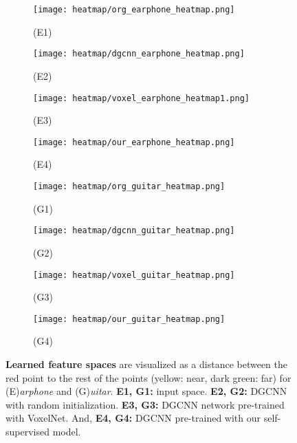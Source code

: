 \documentclass{article}
\begin{document}
\begin{figure}[h]
	\centering    
    	\begin{subfigure}{.45\textwidth}
		\centering
		\texttt{[image: heatmap/org\_earphone\_heatmap.png]}
		\caption*{(E1)}
		\label{fig:heat9}
	\end{subfigure}\begin{subfigure}{.45\textwidth}
		\centering
		\texttt{[image: heatmap/dgcnn\_earphone\_heatmap.png]}
		\caption*{(E2)}
		\label{fig:heat10}
    \end{subfigure}
    \begin{subfigure}{.45\textwidth}
		\centering
		\texttt{[image: heatmap/voxel\_earphone\_heatmap1.png]}
		\caption*{(E3)}
		\label{fig:heat11}
	\end{subfigure}\begin{subfigure}{.45\textwidth}
		\centering
		\texttt{[image: heatmap/our\_earphone\_heatmap.png]}
		\caption*{(E4)}
		\label{fig:heat12}
	\end{subfigure}
	\begin{subfigure}{.45\textwidth}
		\centering
		\texttt{[image: heatmap/org\_guitar\_heatmap.png]}
		\caption*{(G1)}
		\label{fig:heat13}
    \end{subfigure}\begin{subfigure}{.45\textwidth}
		\centering
		\texttt{[image: heatmap/dgcnn\_guitar\_heatmap.png]}
		\caption*{(G2)}
		\label{fig:heat14}
    \end{subfigure}
    \begin{subfigure}{.45\textwidth}
		\centering
		\texttt{[image: heatmap/voxel\_guitar\_heatmap.png]}
		\caption*{(G3)}
		\label{fig:heat15}
	\end{subfigure}\begin{subfigure}{.45\textwidth}
		\centering
		\texttt{[image: heatmap/our\_guitar\_heatmap.png]}
		\caption*{(G4)}
		\label{fig:heat16}
    \end{subfigure}
\caption{\textbf{Learned feature spaces} are visualized as a distance between the red point to the rest of the points (yellow: near, dark green: far) for (E)\emph{arphone} and (G)\emph{uitar}. \textbf{E1, G1:} input  space. \textbf{E2, G2:} DGCNN with random initialization. \textbf{E3, G3:} DGCNN network pre-trained with VoxelNet. And, \textbf{E4, G4:} DGCNN pre-trained with our self-supervised model.}
	\label{fig:heatmap_supp3}
\end{figure} 
\end{document}
